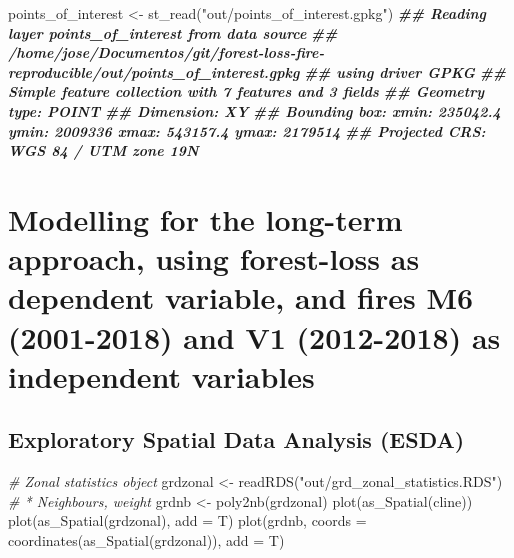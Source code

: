 \documentclass[10pt,landscape,a3paper]{article}
\newenvironment{Shaded}{\begin{snugshade}}{\end{snugshade}}
\newcommand{\AttributeTok}[1]{\textcolor[rgb]{0.77,0.63,0.00}{#1}}
\newcommand{\CommentTok}[1]{\textcolor[rgb]{0.56,0.35,0.01}{\textit{#1}}}
\newcommand{\DocumentationTok}[1]{\textcolor[rgb]{0.56,0.35,0.01}{\textbf{\textit{#1}}}}
\newcommand{\FunctionTok}[1]{\textcolor[rgb]{0.00,0.00,0.00}{#1}}
\newcommand{\NormalTok}[1]{#1}
\newcommand{\OtherTok}[1]{\textcolor[rgb]{0.56,0.35,0.01}{#1}}
\newcommand{\StringTok}[1]{\textcolor[rgb]{0.31,0.60,0.02}{#1}}
\begin{document}
\begin{Shaded}
\begin{Highlighting}[]
\NormalTok{points\_of\_interest }\OtherTok{\textless{}{-}} \FunctionTok{st\_read}\NormalTok{(}\StringTok{"out/points\_of\_interest.gpkg"}\NormalTok{)}
\DocumentationTok{\#\# Reading layer \textasciigrave{}points\_of\_interest\textquotesingle{} from data source }
\DocumentationTok{\#\#   \textasciigrave{}/home/jose/Documentos/git/forest{-}loss{-}fire{-}reproducible/out/points\_of\_interest.gpkg\textquotesingle{} }
\DocumentationTok{\#\#   using driver \textasciigrave{}GPKG\textquotesingle{}}
\DocumentationTok{\#\# Simple feature collection with 7 features and 3 fields}
\DocumentationTok{\#\# Geometry type: POINT}
\DocumentationTok{\#\# Dimension:     XY}
\DocumentationTok{\#\# Bounding box:  xmin: 235042.4 ymin: 2009336 xmax: 543157.4 ymax: 2179514}
\DocumentationTok{\#\# Projected CRS: WGS 84 / UTM zone 19N}
\end{Highlighting}
\end{Shaded}

\hypertarget{modelling-for-the-long-term-approach-using-forest-loss-as-dependent-variable-and-fires-m6-2001-2018-and-v1-2012-2018-as-independent-variables}{%
\section{\texorpdfstring{Modelling for the \textbf{long-term approach},
using forest-loss as dependent variable, and fires M6 (2001-2018) and V1
(2012-2018) as independent
variables}{Modelling for the long-term approach, using forest-loss as dependent variable, and fires M6 (2001-2018) and V1 (2012-2018) as independent variables}}\label{modelling-for-the-long-term-approach-using-forest-loss-as-dependent-variable-and-fires-m6-2001-2018-and-v1-2012-2018-as-independent-variables}}

\hypertarget{exploratory-spatial-data-analysis-esda}{%
\subsection{Exploratory Spatial Data Analysis
(ESDA)}\label{exploratory-spatial-data-analysis-esda}}

\begin{Shaded}
\begin{Highlighting}[]
\CommentTok{\# Zonal statistics object}
\NormalTok{grdzonal }\OtherTok{\textless{}{-}} \FunctionTok{readRDS}\NormalTok{(}\StringTok{"out/grd\_zonal\_statistics.RDS"}\NormalTok{)}
\CommentTok{\# * Neighbours, weight}
\NormalTok{grdnb }\OtherTok{\textless{}{-}} \FunctionTok{poly2nb}\NormalTok{(grdzonal)}
\FunctionTok{plot}\NormalTok{(}\FunctionTok{as\_Spatial}\NormalTok{(cline))}
\FunctionTok{plot}\NormalTok{(}\FunctionTok{as\_Spatial}\NormalTok{(grdzonal), }\AttributeTok{add =}\NormalTok{ T)}
\FunctionTok{plot}\NormalTok{(grdnb, }\AttributeTok{coords =} \FunctionTok{coordinates}\NormalTok{(}\FunctionTok{as\_Spatial}\NormalTok{(grdzonal)), }\AttributeTok{add =}\NormalTok{ T)}
\end{Highlighting}
\end{Shaded}
\end{document}
